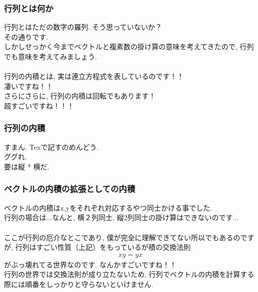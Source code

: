 \documentclass[11pt,a4paper]{jreport}
\begin{document}
\subsubsection{行列とは何か}
行列とはただの数字の羅列..そう思っていないか？\\
その通りです.\\
しかしせっかく今までベクトルと複素数の掛け算の意味を考えてきたので, 行列でも意味を考えてみましょう.\\
\\
行列の内積とは, 実は連立方程式を表しているのです！！\\
凄いですね！！\\
さらにさらに, 行列の内積は回転でもあります！\\
超すごいですね！！！\\
\subsubsection{行列の内積}
すまん. Texで記すのめんどう. 
\\
ググれ.
\\
要は縦 * 横だ.\\

\subsubsection{ベクトルの内積の拡張としての内積}
ベクトルの内積はx,yをそれぞれ対応するやつ同士かける事でした.\\
行列の場合は...なんと, 横２列同士, 縦2列同士の掛け算はできないのです...\\
\\
ここが行列の厄介なとこであり, 僕が完全に理解できてない所以でもあるのですが, 行列はすごい性質（上記）をもっているが積の交換法則
\begin{eqnarray}
xy = yx
\end{eqnarray}
がぶっ壊れてる世界なのです. なんかすごいですね！！\\
行列の世界では交換法則が成り立たないため, 行列でベクトルの内積を計算する際には順番をしっかりと守らないといけません.\\
\end{document}
